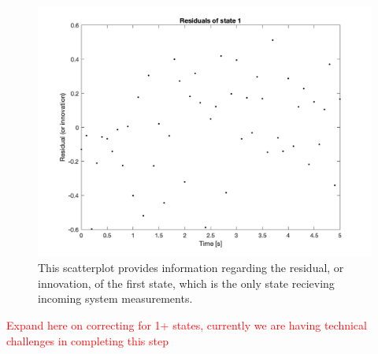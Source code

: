 \begin{figure}[h]
    \centering
    \includegraphics[scale = 0.6]{Meskin_residuals_state1.png}
    \caption{This scatterplot provides information regarding the residual, or innovation, of the first state, which is the only state recieving incoming system measurements.}
\end{figure}

\noindent \textcolor{red}{Expand here on correcting for 1+ states, currently we are having technical challenges in completing this step}













